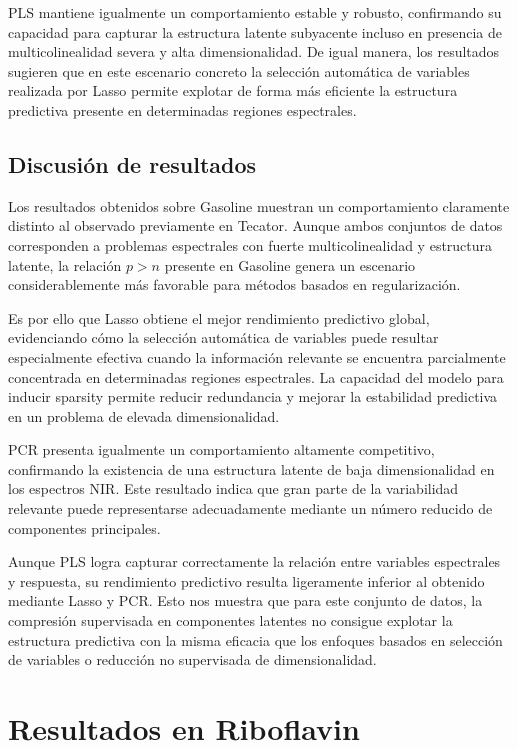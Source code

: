 \documentclass[12pt,a4paper]{report}
\begin{document}
PLS mantiene igualmente un comportamiento estable y robusto, confirmando su capacidad para capturar la estructura latente subyacente incluso en presencia de multicolinealidad severa y alta dimensionalidad. De igual manera, los resultados sugieren que en este escenario concreto la selección automática de variables realizada por Lasso permite explotar de forma más eficiente la estructura predictiva presente en determinadas regiones espectrales.

\subsection{Discusión de resultados}

Los resultados obtenidos sobre Gasoline muestran un comportamiento claramente distinto al observado previamente en Tecator. Aunque ambos conjuntos de datos corresponden a problemas espectrales con fuerte multicolinealidad y estructura latente, la relación $p > n$ presente en Gasoline genera un escenario considerablemente más favorable para métodos basados en regularización.

Es por ello que Lasso obtiene el mejor rendimiento predictivo global, evidenciando cómo la selección automática de variables puede resultar especialmente efectiva cuando la información relevante se encuentra parcialmente concentrada en determinadas regiones espectrales. La capacidad del modelo para inducir sparsity permite reducir redundancia y mejorar la estabilidad predictiva en un problema de elevada dimensionalidad.

PCR presenta igualmente un comportamiento altamente competitivo, confirmando la existencia de una estructura latente de baja dimensionalidad en los espectros NIR. Este resultado indica que gran parte de la variabilidad relevante puede representarse adecuadamente mediante un número reducido de componentes principales.

Aunque PLS logra capturar correctamente la relación entre variables espectrales y respuesta, su rendimiento predictivo resulta ligeramente inferior al obtenido mediante Lasso y PCR. Esto nos muestra que para este conjunto de datos, la compresión supervisada en componentes latentes no consigue explotar la estructura predictiva con la misma eficacia que los enfoques basados en selección de variables o reducción no supervisada de dimensionalidad.

\section{Resultados en Riboflavin}
\end{document}

